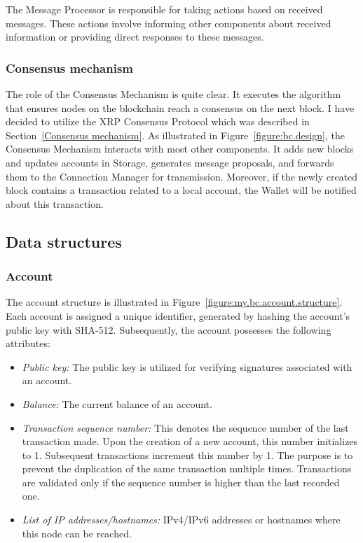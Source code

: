 The Message Processor is responsible for taking actions based on received messages. These actions involve informing other components about received information or providing direct responses to these messages.

\subsubsection{Consensus mechanism}

The role of the Consensus Mechanism is quite clear. It executes the algorithm that ensures nodes on the blockchain reach a consensus on the next block. I have decided to utilize the XRP Consensus Protocol which was described in Section~\ref{Consensus mechanism}. As illustrated in Figure~\ref{figure:bc.design}, the Consensus Mechanism interacts with most other components. It adds new blocks and updates accounts in Storage, generates message proposals, and forwards them to the Connection Manager for transmission. Moreover, if the newly created block contains a transaction related to a local account, the Wallet will be notified about this transaction.

\subsection{Data structures}
\label{sec:design.data.structures}

\subsubsection{Account}

The account structure is illustrated in Figure~\ref{figure:my.bc.account.structure}. Each account is assigned a unique identifier, generated by hashing the account's public key with SHA-512. Subsequently, the account possesses the following attributes:

\begin{itemize}
    \item \emph{Public key:} The public key is utilized for verifying signatures associated with an account.
    \item \emph{Balance:} The current balance of an account.
    \item \emph{Transaction sequence number:} This denotes the sequence number of the last transaction made. Upon the creation of a new account, this number initializes to 1. Subsequent transactions increment this number by 1. The purpose is to prevent the duplication of the same transaction multiple times. Transactions are validated only if the sequence number is higher than the last recorded one.
    \item \emph{List of IP addresses/hostnames:} IPv4/IPv6 addresses or hostnames where this node can be reached.
\end{itemize}


